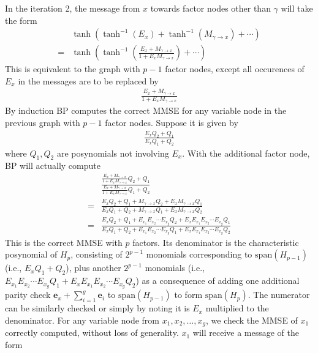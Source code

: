 \documentclass[conference]{IEEEtran}
\newcommand{\vect}[1]{\mathbf{#1}}
\begin{document}
In the iteration 2, the message from $x$ towards factor nodes other than $\gamma$ will take the form
\begin{align*}
&\tanh\left(\tanh^{-1}(E_x) + \tanh^{-1}(M_{\gamma\rightarrow x})+\cdots \right)\\
=&\tanh\left(\tanh^{-1}\left(\frac{E_x + M_{\gamma\rightarrow x}}{1+E_xM_{\gamma\rightarrow x}}\right)+\cdots\right)
\end{align*}
This is equivalent to the graph with $p-1$ factor nodes, except all occurences of $E_x$ in the messages are to be replaced by
\begin{align*}
\frac{E_x + M_{\gamma\rightarrow x}}{1+E_xM_{\gamma\rightarrow x}}
\end{align*}
By induction BP computes the correct MMSE for any variable node in the previous graph with $p-1$ factor nodes. Suppose it is given by
\begin{align*}
\frac{E_xQ_2+Q_1}{E_xQ_1+Q_2}
\end{align*}
where $Q_1, Q_2$ are posynomials not involving $E_x$. With the additional factor node, BP will actually compute
\begin{align*}
&\frac{\frac{E_x + M_{\gamma\rightarrow x}}{1+E_xM_{\gamma\rightarrow x}}Q_2+Q_1}{\frac{E_x + M_{\gamma\rightarrow x}}{1+E_xM_{\gamma\rightarrow x}}Q_1+Q_2}\\
=&\frac{E_xQ_2+Q_1+M_{\gamma\rightarrow x}Q_2 + E_xM_{\gamma\rightarrow x}Q_1}{E_xQ_1+Q_2+M_{\gamma\rightarrow x}Q_1 + E_xM_{\gamma\rightarrow x}Q_2}\\
=&\frac{E_xQ_2+Q_1+E_{x_1}E_{x_2}\cdots E_{x_g}Q_2 + E_xE_{x_1}E_{x_2}\cdots E_{x_g}Q_1}{E_xQ_1+Q_2+E_{x_1}E_{x_2}\cdots E_{x_g}Q_1 + E_xE_{x_1}E_{x_2}\cdots E_{x_g}Q_2}
\end{align*}
This is the correct MMSE with $p$ factors. Its denominator is the characteristic posynomial of $H_p$, consisting of $2^{p-1}$ monomials corresponding to $\mathrm{span}(H_{p-1})$ (i.e., $E_xQ_1+Q_2$), plus another $2^{p-1}$ monomials (i.e., $E_{x_1}E_{x_2}\cdots E_{x_g}Q_1 + E_xE_{x_1}E_{x_2}\cdots E_{x_g}Q_2$) as a consequence of adding one additional parity check $\vect{e}_x+\sum_{i=1}^g\vect{e}_i$ to $\mathrm{span}(H_{p-1})$ to form $\mathrm{span}(H_p)$. The numerator can be similarly checked or simply by noting it is $E_x$ multiplied to the denominator. For any variable node from $x_1, x_2, \ldots, x_g$, we check the MMSE of $x_1$ correctly computed, without loss of generality. $x_1$ will receive a message of the form
\end{document}
